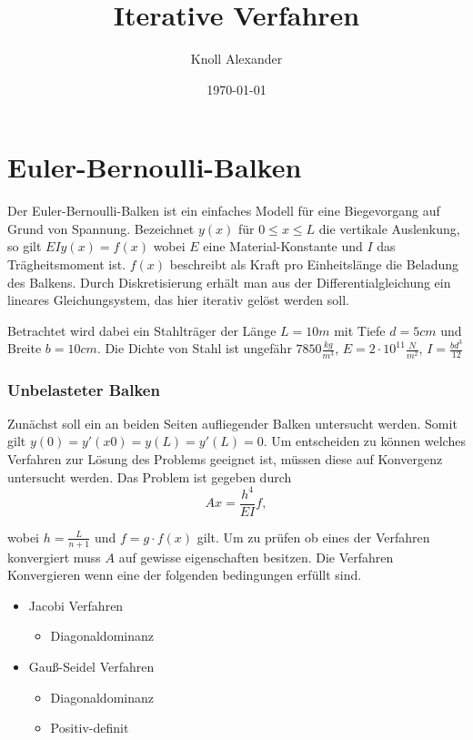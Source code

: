 \documentclass[12pt,titlepage]{article}
\author{Knoll Alexander }
\title{Iterative Verfahren}
\date{\today}
\begin{document}
\maketitle

\part*{Euler-Bernoulli-Balken}

	Der Euler-Bernoulli-Balken ist ein einfaches Modell für eine Biegevorgang auf Grund von
	Spannung. Bezeichnet $y(x)$ für $0 \leq x \leq L$ die vertikale Auslenkung, so gilt
	$EIy (x) = f (x)$ wobei $E$ eine Material-Konstante und $I$ das Trägheitsmoment ist. 
	$f(x)$ beschreibt als Kraft pro Einheitslänge die Beladung des Balkens. Durch Diskretisierung erhält man aus der Differentialgleichung ein lineares Gleichungsystem, das hier iterativ gelöst werden soll.
	
	Betrachtet wird dabei ein Stahlträger der Länge $L = 10m$ mit Tiefe $d = 5cm$ und Breite $b = 10cm$. Die Dichte von Stahl ist ungefähr $7850 \frac{kg}{m^3}$, 
	$E = 2 \cdot 10^11 \frac{N}{m^2}$, $I = \frac{bd^3}{12}$

\section{Unbelasteter Balken}

	Zunächst soll ein an beiden Seiten aufliegender Balken untersucht werden.
	Somit gilt $y(0) = y'(x0) = y(L) = y'(L) = 0 $.\newline
	Um entscheiden zu können welches Verfahren zur Lösung des Problems geeignet ist, müssen diese auf Konvergenz untersucht werden. Das Problem ist gegeben durch
	\begin{equation}
		Ax = \frac{h^4}{EI}f,
	\end{equation}
	
	wobei $h = \frac{L}{n+1}$ und $f = g \cdot f(x)$ gilt. Um zu prüfen ob eines der Verfahren konvergiert muss $A$ auf gewisse eigenschaften besitzen. Die Verfahren Konvergieren wenn eine der folgenden bedingungen erfüllt sind.
	
	\begin{itemize}
		\centering
		\item Jacobi Verfahren
		\begin{itemize}
			\centering	
			\item Diagonaldominanz
		\end{itemize}
		\item Gauß-Seidel Verfahren
		\begin{itemize}
			\centering
			\item Diagonaldominanz
			\item Positiv-definit
		\end{itemize}
	\end{itemize}
	
\end{document}
